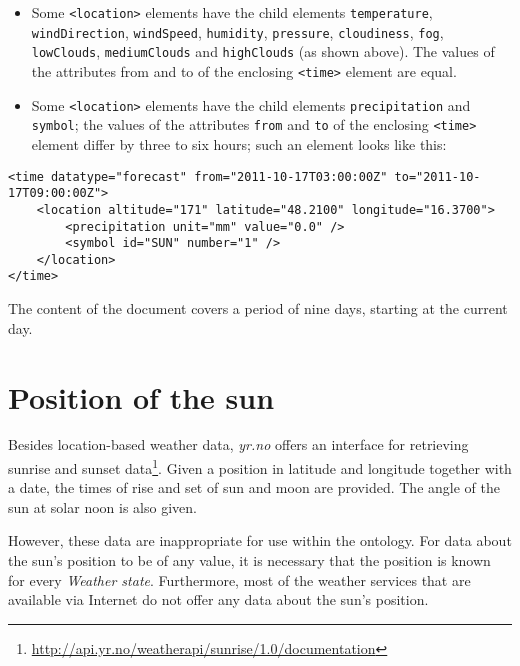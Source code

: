 \begin{itemize}
  \item Some \texttt{<location>} elements have the child elements \texttt{temperature}, \texttt{windDirection}, \texttt{windSpeed}, \texttt{humidity}, \texttt{pressure}, \texttt{cloudiness}, \texttt{fog}, \texttt{lowClouds}, \texttt{mediumClouds} and \texttt{highClouds} (as shown above). The values of the attributes from and to of the enclosing \texttt{<time>} element are equal.
  \item Some \texttt{<location>} elements have the child elements \texttt{precipitation} and \texttt{symbol}; the values of the attributes \texttt{from} and \texttt{to} of the enclosing \texttt{<time>} element differ by three to six hours; such an element looks like this:
\end{itemize}

\begin{lstlisting}
<time datatype="forecast" from="2011-10-17T03:00:00Z" to="2011-10-17T09:00:00Z">
	<location altitude="171" latitude="48.2100" longitude="16.3700">
		<precipitation unit="mm" value="0.0" />
		<symbol id="SUN" number="1" />
	</location>
</time>
\end{lstlisting}

The content of the  document covers a period of nine days, starting at the current day.

\section{Position of the sun}
\label{sec:sun_position}

Besides location-based weather data, \emph{yr.no} offers an interface for retrieving sunrise and sunset data\footnote{\href{http://api.yr.no/weatherapi/sunrise/1.0/documentation}{http://api.yr.no/weatherapi/sunrise/1.0/documentation}}. Given a position in latitude and longitude together with a date, the times of rise and set of sun and moon are provided. The angle of the sun at solar noon is also given.

However, these data are inappropriate for use within the \thinkhomeweather ontology. For data about the sun's position to be of any value, it is necessary that the position is known for every \emph{Weather state}. Furthermore, most of the weather services that are available via Internet do not offer any data about the sun's position.

